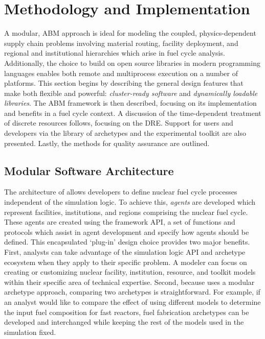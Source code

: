 \section{Methodology and Implementation}

A modular, \acrfull{ABM} approach is ideal for modeling the coupled,
physics-dependent supply chain problems involving material routing, facility
deployment, and regional and institutional hierarchies which arise in fuel 
cycle analysis. Additionally, the choice
to build \Cyclus on open source libraries in modern programming languages
enables both remote and multiprocess execution on a number of platforms. This
section begins by describing the general design features that make \Cyclus both
flexible and powerful: \emph{cluster-ready software} and \emph{dynamically
loadable libraries}.  The
\gls{ABM} framework is then described, focusing on its implementation and benefits
in a fuel cycle context. A discussion of the
time-dependent treatment of discrete resources follows, focusing on the
\gls{DRE}. Support for users and developers via the \Cycamore library of
archetypes and the experimental toolkit are also presented.  Lastly, the methods
for quality assurance are outlined.

\subsection{Modular Software Architecture}

The architecture of \Cyclus allows developers to define nuclear fuel cycle
processes independent of the simulation logic. To achieve this, \emph{agents} are
developed which represent facilities, institutions, and regions comprising the
nuclear fuel cycle. These agents are created using the \Cyclus framework
\gls{API}, a set of functions and protocols which assist in agent development
and specify how agents should be defined.  This encapsulated `plug-in' design
choice provides two major benefits. First, analysts can take advantage of the
simulation logic \gls{API} and archetype ecosystem when they apply \Cyclus to
their specific problem.  A modeler can focus on creating or customizing
nuclear facility, institution, resource, and toolkit models within their
specific area of technical expertise. Second, because \Cyclus uses a modular
archetype approach, comparing two archetypes is straightforward. For example, if
an analyst would like to compare the effect of using different models to
determine the input fuel composition for fast reactors, fuel
fabrication archetypes can be developed and interchanged while keeping the rest
of the models used in the simulation fixed.

